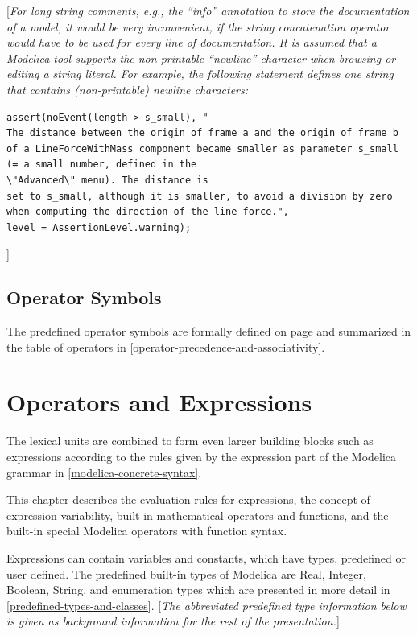 \documentclass[10pt,a4paper]{report}
\def\doublelabel#1{\label{#1}}
\begin{document}
{[}\emph{For long string comments, e.g., the ``info'' annotation to
store the documentation of a model, it would be very inconvenient, if
the string concatenation operator would have to be used for every line
of documentation. It is assumed that a Modelica tool supports the
non-printable ``newline'' character when browsing or editing a string
literal. For example, the following statement defines one string that
contains (non-printable) newline characters:}

\begin{lstlisting}[language=modelica]
assert(noEvent(length > s_small), "
The distance between the origin of frame_a and the origin of frame_b
of a LineForceWithMass component became smaller as parameter s_small
(= a small number, defined in the
\"Advanced\" menu). The distance is
set to s_small, although it is smaller, to avoid a division by zero
when computing the direction of the line force.",
level = AssertionLevel.warning);
\end{lstlisting}
]
\section{Operator Symbols}\doublelabel{operator-symbols}

The predefined operator symbols are formally defined on page \pageref{lexical-conventions} and
summarized in the table of operators in \ref{operator-precedence-and-associativity}.

\chapter{Operators and Expressions}\doublelabel{operators-and-expressions}

The lexical units are combined to form even larger building blocks such
as expressions according to the rules given by the expression part of
the Modelica grammar in \ref{modelica-concrete-syntax}.

This chapter describes the evaluation rules for expressions, the concept
of expression variability, built-in mathematical operators and
functions, and the built-in special Modelica operators with function
syntax.

Expressions can contain variables and constants, which have types,
predefined or user defined. The predefined built-in types of Modelica
are Real, Integer, Boolean, String, and enumeration types which are
presented in more detail in \ref{predefined-types-and-classes}. {[}\emph{The abbreviated
predefined type information below is given as background information for
the rest of the presentation.}{]}
\end{document}
